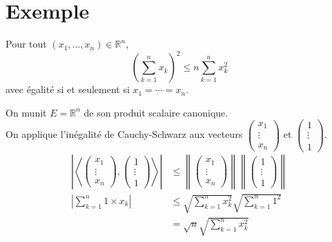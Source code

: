 \documentclass[../main.tex]{subfiles}
\begin{document}
\section{Exemple}
\begin{tcolorbox}[title=Exemple 34.17, title filled=false, colframe=darkgreen, colback=darkgreen!10!white]
    Pour tout $\left(x_1, \ldots, x_n\right) \in \mathbb{R}^n$,
    $$\left(\sum_{k=1}^n x_k\right)^2 \leq n \sum_{k=1}^n x_k^2$$
    avec égalité si et seulement si $x_1 = \cdots = x_n$.
\end{tcolorbox}

\noindent On munit $E = \mathbb{R}^n$ de son produit scalaire canonique. \\
On applique l'inégalité de Cauchy-Schwarz aux vecteurs $\begin{pmatrix}
    x_1 \\ \vdots \\ x_n
\end{pmatrix}$ et $\begin{pmatrix}
    1 \\ \vdots \\ 1
\end{pmatrix}$. 
\begin{align*}
    \left| \left\langle \begin{pmatrix}
        x_1 \\ \vdots \\ x_n
    \end{pmatrix}, \begin{pmatrix}
        1 \\ \vdots \\ 1
    \end{pmatrix} \right\rangle \right| &\leq \left\| \begin{pmatrix}
        x_1 \\ \vdots \\ x_n
    \end{pmatrix} \right\| \left\| \begin{pmatrix}
        1 \\ \vdots \\ 1
    \end{pmatrix} \right\| \\
    \left| \sum_{k=1}^{n} 1\times x_k \right| &\leq \sqrt{\sum_{k=1}^{n} x_k^2} \sqrt{\sum_{k=1}^{n} 1^2} \\
    &= \sqrt{n} \sqrt{\sum_{k=1}^{n} x_k^2} \\
\end{align*}
\end{document}

